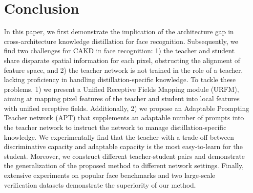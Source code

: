 \documentclass[sigconf]{acmart}
\begin{document}
\section{Conclusion}
In this paper, we first demonstrate the implication of the architecture gap in cross-architecture knowledge distillation for face recognition. Subsequently, we find two challenges for CAKD in face recognition: 1) the teacher and student share disparate spatial information for each pixel, obstructing the alignment of feature space, and 2) the teacher network is not trained in the role of a teacher, lacking proficiency in handling distillation-specific knowledge. To tackle these problems, 1) we present a Unified Receptive Fields Mapping module (URFM), aiming at mapping pixel features of the teacher and student into local features with unified receptive fields. Additionally, 2) we propose an Adaptable Prompting Teacher network (APT) that supplements an adaptable number of prompts into the teacher network to instruct the network to manage distillation-specific knowledge. We experimentally find that the teacher with a trade-off between discriminative capacity and adaptable capacity is the most easy-to-learn for the student. Moreover, we construct different teacher-student pairs and demonstrate the generalization of the proposed method to different network settings. Finally, extensive experiments on popular face benchmarks and two large-scale verification datasets demonstrate the superiority of our method.





\end{document}
